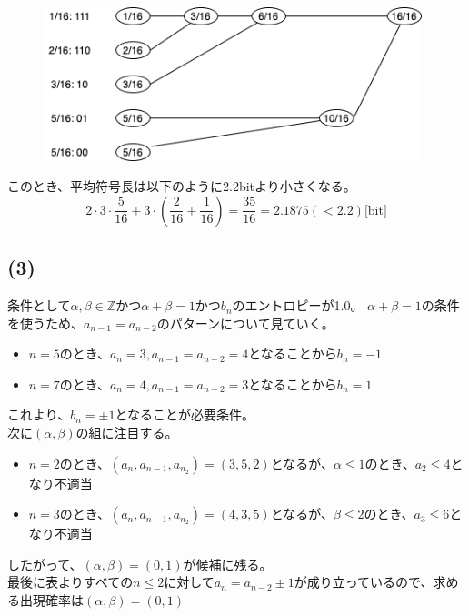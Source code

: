 \documentclass[a4paper,12pt,xelatex,ja=standard]{bxjsarticle}
\begin{document}
\begin{figure}[H]
  \centering
  \includegraphics[width=11cm]{images/2017_huffman_tree.png}
\end{figure}

このとき、平均符号長は以下のように2.2bitより小さくなる。
\[
  2 \cdot 3 \cdot \frac{5}{16} + 3 \cdot \left(\frac{2}{16} + \frac{1}{16}\right)= \frac{35}{16} = 2.1875 (< 2.2) \text{[bit]}
\]

\subsection*{(3)}
条件として$\alpha, \beta \in \mathbb{Z}$かつ$\alpha + \beta = 1$かつ$b_n$のエントロピーが1.0。
$\alpha + \beta = 1$の条件を使うため、$a_{n-1} = a_{n-2}$のパターンについて見ていく。

\begin{itemize}
  \item $n = 5$のとき、$a_n = 3, a_{n-1} = a_{n-2} = 4$となることから$b_n = -1$
  \item $n = 7$のとき、$a_n = 4, a_{n-1} = a_{n-2} = 3$となることから$b_n = 1$
\end{itemize}

これより、$b_n = \pm 1$となることが必要条件。\\

次に$(\alpha, \beta)$の組に注目する。\\

\begin{itemize}
  \item $n = 2$のとき、$(a_n, a_{n-1}, a_{n_2}) = (3, 5, 2)$となるが、$\alpha \leq 1$のとき、$a_2 \leq 4$となり不適当
  \item $n = 3$のとき、$(a_n, a_{n-1}, a_{n_2}) = (4, 3, 5)$となるが、$\beta \leq 2$のとき、$a_3 \leq 6$となり不適当
\end{itemize}

したがって、$(\alpha, \beta) = (0, 1)$が候補に残る。\\

最後に表よりすべての$n \leq 2$に対して$a_{n} = a_{n-2} \pm 1$が成り立っているので、求める出現確率は$(\alpha, \beta) = (0, 1)$
\end{document}
